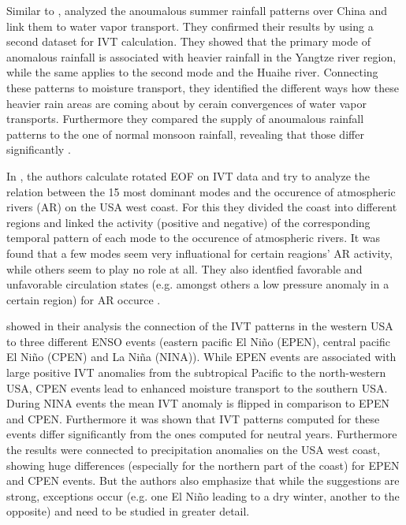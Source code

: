 Similar to \cite{fernandez_analysis_2003}, \citeauthor{zhou_atmospheric_2005} analyzed the anoumalous summer rainfall patterns over China and link them to water vapor transport. 
They confirmed their results by using a second dataset for IVT calculation. 
They showed that the primary mode of anomalous rainfall is associated with heavier rainfall in the Yangtze river region, while the same applies to the second mode and the Huaihe river. 
Connecting these patterns to moisture transport, they identified the different ways how these heavier rain areas are coming about by cerain convergences of water vapor transports. 
Furthermore they compared the supply of anoumalous rainfall patterns to the one of normal monsoon rainfall, revealing that those differ significantly \cite{zhou_atmospheric_2005}.


In \cite{guirguis_circulation_2018}, the authors calculate rotated EOF on IVT data and try to analyze the relation between the 15 most dominant modes and the occurence of atmospheric rivers (AR) on the USA west coast. 
For this they divided the coast into different regions and linked the activity (positive and negative) of the corresponding temporal pattern of each mode to the occurence of atmospheric rivers. 
It was found that a few modes seem very influational for certain reagions' AR activity, while others seem to play no role at all. 
They also identfied favorable and unfavorable circulation states (e.g. amongst others a low pressure anomaly in a certain region) for AR occurce \cite{guirguis_circulation_2018}. 


\citeauthor{kim_ensos_2015} showed in their analysis the connection of the IVT patterns in the western USA to three different ENSO events (eastern pacific El Niño (EPEN), central pacific El Niño (CPEN) and La Niña (NINA)). 
While EPEN events are associated with large positive IVT anomalies from the subtropical Pacific to the north-western USA, CPEN events lead to enhanced moisture transport to the southern USA. 
During NINA events the mean IVT anomaly is flipped in comparison to EPEN and CPEN. 
Furthermore it was shown that IVT patterns computed for these events differ significantly from the ones computed for neutral years.
Furthermore the results were connected to precipitation anomalies on the USA west coast, showing huge differences (especially for the northern part of the coast) for EPEN and CPEN events. 
But the authors also emphasize that while the suggestions are strong, exceptions occur (e.g. one El Niño leading to a dry winter, another to the opposite) and need to be studied in greater detail.

